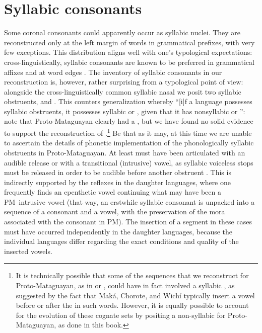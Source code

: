 \begin{exe}
    \ex \elbow
    \ex \suncho
    \ex \palm
\end{exe}

\section{Syllabic consonants}\label{syllabic-C}
Some coronal consonants could apparently occur as syllabic nuclei. They are reconstructed only at the left margin of words in grammatical prefixes, with very few exceptions. This distribution aligns well with one’s typological expectations: cross-linguistically, syllabic consonants are known to be preferred in grammatical affixes and at word edges \citep[159–161]{AB78}. The inventory of syllabic consonants in our reconstruction is, however, rather surprising from a typological point of view: alongside the cross-linguistically common syllabic nasal  we posit two syllabic obstruents,  and . This counters  generalization whereby ``[i]f a language possesses syllabic obstruents, it possesses syllabic  or  , given that it has nonsyllabic  or  '': note that Proto-Mataguayan clearly had a , but we have found no solid evidence to support the reconstruction of .\footnote{It is technically possible that some of the  sequences that we reconstruct for Proto-Mataguayan, as in  or , could have in fact involved a syllabic , as suggested by the fact that Maká, Chorote, and Wichí typically insert a vowel before or after the  in such words. However, it is equally possible to account for the evolution of these cognate sets by positing a non-syllabic  for Proto-Mataguayan, as done in this book.} Be that as it may, at this time we are unable to ascertain the details of phonetic implementation of the phonologically syllabic obstruents in Proto-Mataguayan. At least  must have been articulated with an audible release or with a transitional (intrusive) vowel, as syllabic voiceless stops must be released in order to be audible before another obstruent \citep[185]{AB78}. This is indirectly supported by the reflexes in the daughter languages, where one frequently finds an epenthetic vowel continuing what may have been a PM~intrusive vowel (that way, an erstwhile syllabic consonant is unpacked into a sequence of a consonant and a vowel, with the preservation of the mora associated with the consonant in PM). The insertion of a segment in these cases must have occurred independently in the daughter languages, because the individual languages differ regarding the exact conditions and quality of the inserted vowels.

